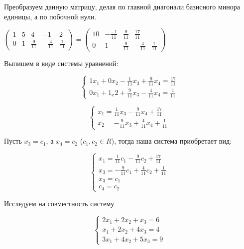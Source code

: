 \documentclass{article}
\begin{document}
Преобразуем данную матрицу, делая по главной диагонали базисного минора единицы, а по побочной нули.

$\begin{pmatrix}
    1 & 5 & 4 & -1 & 2 \\
    0 & 1 & \frac{9}{11} & -\frac{4}{11} & \frac{1}{11}
\end{pmatrix} = \begin{pmatrix}
    10 & -\frac{-1}{11} & \frac{9}{11} & \frac{17}{11} \\
    0 & 1 & \frac{9}{11} & -\frac{4}{11} & \frac{1}{11}
\end{pmatrix}$

Выпишем в виде системы уравнений:

\begin{equation}
    \begin{cases}
        1x_1 + 0x_2 - \frac{1}{11}x_3 + \frac{9}{11}x_4 = \frac{17}{11} \\
        0x_1 + 1_x2 + \frac{9}{11}x_3 - \frac{4}{11}x_4 = \frac{1}{11}
    \end{cases}
\end{equation}

\begin{equation}
    \begin{cases}
        x_1 = \frac{1}{11}x_3 - \frac{9}{11}x_4 + \frac{17}{11} \\
        x_2 = -\frac{9}{11}x_3 + \frac{4}{11}x_4 + \frac{1}{11}
    \end{cases}
\end{equation}

Пусть $x_3 = c_1$, а $x_4 = c_2$ ($c_1, c_2 \in R$), тогда наша система приобретает вид:

\begin{equation}
    \begin{cases}
        x_1 = \frac{1}{11}c_1 - \frac{9}{11}c_2 + \frac{17}{11} \\
        x_3 = -\frac{9}{11}c_1 + \frac{4}{11}c_2 + \frac{1}{11} \\
        x_3 = c_1 \\
        c_4 = c_2
    \end{cases}
\end{equation}

Исследуем на совместность систему

\begin{equation}
    \begin{cases}
        2x_1 + 2x_2 + x_3 = 6 \\
        x_1 + 2x_2 + 4x_3 = 4 \\
        3x_1 + 4x_2 + 5x_3 = 9
    \end{cases}
\end{equation}
\end{document}
